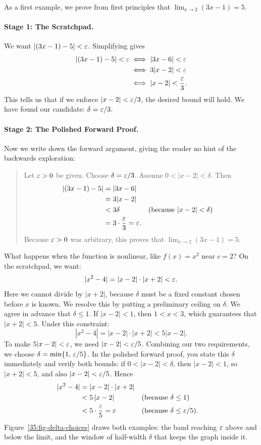 As a first example, we prove from first principles that $\lim_{x \to 2} (3x - 1) = 5$.

\paragraph{Stage 1: The Scratchpad.}
We want $|(3x - 1) - 5| < \varepsilon$. Simplifying gives
\begin{align*}
|(3x - 1) - 5| < \varepsilon &\iff |3x - 6| < \varepsilon \\
&\iff 3|x - 2| < \varepsilon \\
&\iff |x - 2| < \frac{\varepsilon}{3}.
\end{align*}
This tells us that if we enforce $|x - 2| < \varepsilon/3$, the desired bound will hold. We have found our candidate: $\delta = \varepsilon/3$.

\paragraph{Stage 2: The Polished Forward Proof.}
Now we write down the forward argument, giving the reader no hint of the backwards exploration:
\begin{quote}
Let $\varepsilon > 0$ be given. Choose $\delta = \varepsilon/3$. Assume $0 < |x - 2| < \delta$. Then
\begin{align*}
|(3x - 1) - 5| &= |3x - 6| \\
&= 3|x - 2| \\
&< 3\delta && \text{(because } |x - 2| < \delta\text{)} \\
&= 3 \cdot \frac{\varepsilon}{3} = \varepsilon.
\end{align*}
Because $\varepsilon > 0$ was arbitrary, this proves that $\lim_{x \to 2} (3x - 1) = 5$.
\end{quote}

What happens when the function is nonlinear, like $f(x) = x^2$ near $c = 2$? On the scratchpad, we want:
\[
|x^2 - 4| = |x - 2| \cdot |x + 2| < \varepsilon.
\]
Here we cannot divide by $|x + 2|$, because $\delta$ must be a fixed constant chosen before $x$ is known. We resolve this by putting a preliminary ceiling on $\delta$. We agree in advance that $\delta \le 1$. If $|x - 2| < 1$, then $1 < x < 3$, which guarantees that $|x + 2| < 5$. Under this constraint:
\[
|x^2 - 4| = |x - 2| \cdot |x + 2| < 5|x - 2|.
\]
To make $5|x - 2| < \varepsilon$, we need $|x - 2| < \varepsilon/5$. Combining our two requirements, we choose $\delta = \min\{1, \, \varepsilon/5\}$. In the polished forward proof, you state this $\delta$ immediately and verify both bounds: if $0 < |x - 2| < \delta$, then $|x - 2| < 1$, so $|x + 2| < 5$, and also $|x - 2| < \varepsilon/5$. Hence
\begin{align*}
|x^2 - 4| &= |x - 2| \cdot |x + 2| \\
&< 5\,|x - 2| && \text{(because } \delta \le 1\text{)} \\
&< 5 \cdot \frac{\varepsilon}{5} = \varepsilon && \text{(because } \delta \le \varepsilon/5\text{)}.
\end{align*}
Figure~\ref{35:fig-delta-choices} draws both examples: the band reaching $\varepsilon$ above and below the limit, and the window of half-width $\delta$ that keeps the graph inside it.

